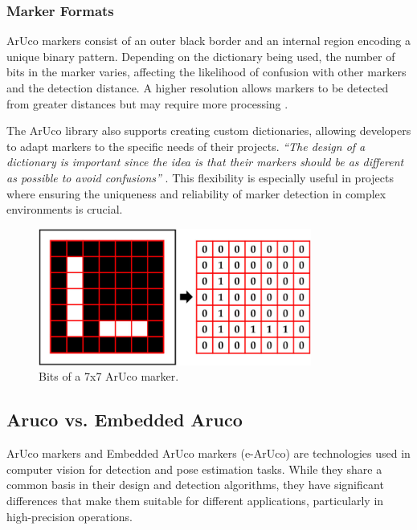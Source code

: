    \subsubsection{Marker Formats}

    ArUco markers consist of an outer black border and an internal region encoding a unique binary pattern. Depending on the dictionary being used, the number of bits in the marker varies, affecting the likelihood of confusion with other markers and the detection distance. A higher resolution allows markers to be detected from greater distances but may require more processing \cite{aruco_docs}.

    The ArUco library also supports creating custom dictionaries, allowing developers to adapt markers to the specific needs of their projects. \textit{“The design of a dictionary is important since the idea is that their markers should be as different as possible to avoid confusions”} \cite{aruco_docs_pdf}. This flexibility is especially useful in projects where ensuring the uniqueness and reliability of marker detection in complex environments is crucial.

    \begin{figure}[h!] 
    \centering 
    \includegraphics[width=0.8\textwidth]{pictures/bits_aruco.png} %
    \caption{Bits of a 7x7 ArUco marker.} 
    \label{fig} 
    \end{figure}

\subsection{Aruco vs. Embedded Aruco}

    ArUco markers and Embedded ArUco markers (e-ArUco) are technologies used in computer vision for detection and pose estimation tasks. While they share a common basis in their design and detection algorithms, they have significant differences that make them suitable for different applications, particularly in high-precision operations.

